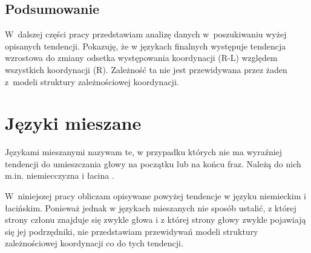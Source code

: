 \subsection{Podsumowanie}

W~dalszej części pracy przedstawiam analizę danych w~poszukiwaniu wyżej opisanych tendencji. Pokazuję, że w językach finalnych występuje tendencja wzrostowa do zmiany odsetka występowania koordynacji (R-L) względem wszystkich koordynacji (R). Zależność ta nie jest przewidywana przez żaden z~modeli struktury zależnościowej koordynacji.


\section{Języki mieszane}

Językami mieszanymi nazywam te, w przypadku których nie ma wyraźniej tendencji do umieszczania głowy na początku lub na końcu fraz. Należą do nich m.in. niemiecczyzna i łacina \citep{polinsky2020headedness}.

W~niniejszej pracy obliczam opisywane powyżej tendencje w języku niemieckim i łacińskim. Ponieważ jednak w językach mieszanych nie sposób ustalić, z której strony członu znajduje się zwykle głowa i z której strony głowy zwykle pojawiają się jej podrzędniki, nie przedstawiam przewidywań modeli struktury zależnościowej koordynacji co do tych tendencji. 

